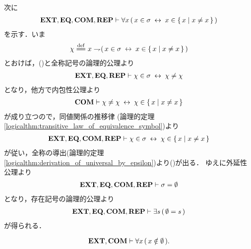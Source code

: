 \begin{sketch}
		次に
		\begin{align}
			\mbox{{\bf EXT}},\mbox{{\bf EQ}},\mbox{\bf COM},\mbox{{\bf REP}} \vdash
			\forall x\, (\, x \in \sigma \hspace{0.25em}\leftrightarrow\hspace{0.25em} x \in \{\, x \mid x \neq x\, \}\, )
			\label{fom:thm_emptyset_is_a_set_5}
		\end{align}
		を示す．いま
		\begin{align}
			\chi \defeq x \negation (\, x \in \sigma \lrarrow x \in \Set{x}{x \neq x}\, )
		\end{align}
		とおけば，()と全称記号の論理的公理より
		\begin{align}
			\mbox{{\bf EXT}},\mbox{{\bf EQ}},\mbox{{\bf REP}} \vdash \chi \in \sigma \hspace{0.25em}\leftrightarrow\hspace{0.25em} \chi \neq \chi
		\end{align}
		となり，他方で内包性公理より
		\begin{align}
			\mbox{\bf COM} \vdash \chi \neq \chi \hspace{0.25em}\leftrightarrow\hspace{0.25em} \chi \in \{\, x \mid x \neq x\, \}
		\end{align}
		が成り立つので，同値関係の推移律
		(論理的定理\ref{logicalthm:transitive_law_of_equivalence_symbol})より
		\begin{align}
			\mbox{{\bf EXT}},\mbox{{\bf EQ}},\mbox{\bf COM},\mbox{{\bf REP}} \vdash
			\chi \in \sigma \hspace{0.25em}\leftrightarrow\hspace{0.25em} \chi \in \{\, x \mid x \neq x\, \}
		\end{align}
		が従い，全称の導出(論理的定理\ref{logicalthm:derivation_of_universal_by_epsilon})より()が出る．
		ゆえに外延性公理より
		\begin{align}
			\mbox{{\bf EXT}},\mbox{{\bf EQ}},\mbox{\bf COM},\mbox{{\bf REP}} \vdash \sigma = \emptyset
		\end{align}
		となり，存在記号の論理的公理より
		\begin{align}
			\mbox{{\bf EXT}},\mbox{{\bf EQ}},\mbox{\bf COM},\mbox{{\bf REP}} \vdash \exists s\, (\, \emptyset = s\, )
		\end{align}
		が得られる．
		\QED
	\end{sketch}
	
	\begin{screen}
		\begin{thm}[空集合はいかなる集合も持たない]\label{thm:emptyset_has_nothing}
			\begin{align}
				\mbox{{\bf EXT}},\mbox{\bf COM} \vdash \forall x\, (\, x \notin \emptyset\, ).
			\end{align}
		\end{thm}
	\end{screen}
	
